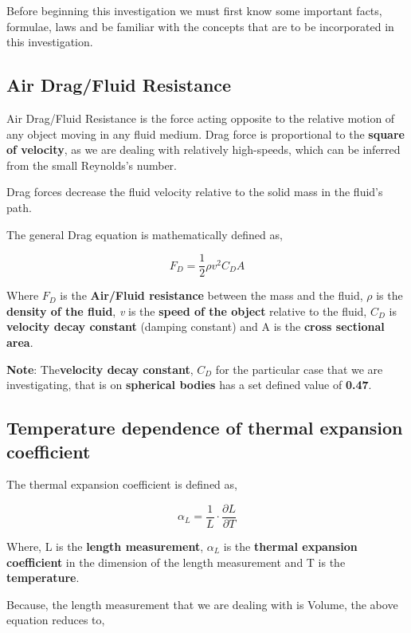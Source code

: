 {Before beginning this investigation we must first know some important facts, formulae, laws and be familiar with the concepts that are to be incorporated in this investigation.}
        
\subsection{{Air Drag/Fluid Resistance}}
        
    {Air Drag/Fluid Resistance is the force acting opposite to the relative motion of any object moving in any fluid medium. Drag force is proportional to the \textbf{square of velocity}, as we are dealing with relatively high-speeds, which can be inferred from the small Reynolds's number.}
            
    {Drag forces decrease the fluid velocity relative to the solid mass in the fluid's path.}
            
    {The general Drag equation is mathematically defined as,}
            
        $$F_D = \frac{1}{2}\rho v^2C_DA$$
           
    {Where $F_D$ is the \textbf{Air/Fluid resistance} between the mass and the fluid, $\rho$ is the \textbf{density of the fluid}, \textit{v} is the \textbf{speed of the object} relative to the fluid, $C_D$ is \textbf{velocity decay constant} (damping constant) and A is the \textbf{cross sectional area}.}
            
    {\textbf{Note}: The\textbf{velocity decay constant}, $C_D$ for the particular case that we are investigating, that is on \textbf{spherical bodies} has a set defined value of \textbf{0.47}.}
            
\subsection{{Temperature dependence of thermal expansion \\ coefficient}}

	{The thermal expansion coefficient is defined as,}
	
		$$\alpha_{L} = \frac{1}{L}\cdot\frac{\partial L}{\partial T}$$
	
	{Where, L is the \textbf{length measurement}, $\alpha_{L}$ is the \textbf{thermal expansion coefficient} in the dimension of the length measurement and T is the \textbf{temperature}.}	
	
	{Because, the length measurement that we are dealing with is Volume, the above equation reduces to,}

